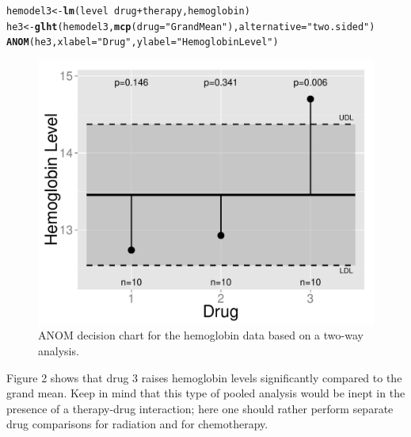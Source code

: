 \documentclass[a4paper]{article}\usepackage[]{graphicx}\usepackage[]{color}
\makeatletter
\def\maxwidth{ %
  \ifdim\Gin@nat@width>\linewidth
    \linewidth
  \else
    \Gin@nat@width
  \fi
}
\newcommand{\hlstr}[1]{\textcolor[rgb]{0.192,0.494,0.8}{#1}}%
\newcommand{\hlopt}[1]{\textcolor[rgb]{0,0,0}{#1}}%
\newcommand{\hlstd}[1]{\textcolor[rgb]{0.345,0.345,0.345}{#1}}%
\newcommand{\hlkwb}[1]{\textcolor[rgb]{0.69,0.353,0.396}{#1}}%
\newcommand{\hlkwc}[1]{\textcolor[rgb]{0.333,0.667,0.333}{#1}}%
\newcommand{\hlkwd}[1]{\textcolor[rgb]{0.737,0.353,0.396}{\textbf{#1}}}%
\newenvironment{kframe}{%
 \def\at@end@of@kframe{}%
 \ifinner\ifhmode%
  \def\at@end@of@kframe{\end{minipage}}%
  \begin{minipage}{\columnwidth}%
 \fi\fi%
 \def\FrameCommand##1{\hskip\@totalleftmargin \hskip-\fboxsep
 \colorbox{shadecolor}{##1}\hskip-\fboxsep
     \hskip-\linewidth \hskip-\@totalleftmargin \hskip\columnwidth}%
 \MakeFramed {\advance\hsize-\width
   \@totalleftmargin\z@ \linewidth\hsize
   \@setminipage}}%
 {\par\unskip\endMakeFramed%
 \at@end@of@kframe}
\newenvironment{knitrout}{}{} %
\makeatother
\begin{document}
\begin{knitrout}
\color{fgcolor}\begin{kframe}
\begin{alltt}
\hlstd{hemodel3} \hlkwb{<-} \hlkwd{lm}\hlstd{(level} \hlopt{~} \hlstd{drug} \hlopt{+} \hlstd{therapy, hemoglobin)}
\hlstd{he3} \hlkwb{<-} \hlkwd{glht}\hlstd{(hemodel3,} \hlkwd{mcp}\hlstd{(}\hlkwc{drug}\hlstd{=}\hlstr{"GrandMean"}\hlstd{),} \hlkwc{alternative}\hlstd{=}\hlstr{"two.sided"}\hlstd{)}
\hlkwd{ANOM}\hlstd{(he3,} \hlkwc{xlabel}\hlstd{=}\hlstr{"Drug"}\hlstd{,} \hlkwc{ylabel}\hlstd{=}\hlstr{"Hemoglobin Level"}\hlstd{)}
\end{alltt}
\end{kframe}\begin{figure}
\includegraphics[width=\maxwidth]{figure/TWOWAY-1} \caption[ANOM decision chart for the hemoglobin data based on a two-way analysis]{ANOM decision chart for the hemoglobin data based on a two-way analysis.}\label{fig:TWOWAY}
\end{figure}


\end{knitrout}

Figure 2 shows that drug 3 raises hemoglobin levels significantly compared to the grand mean. Keep in mind that this type of pooled analysis would be inept in the presence of a therapy-drug interaction; here one should rather perform separate drug comparisons for radiation and for chemotherapy.

\clearpage

\end{document}
